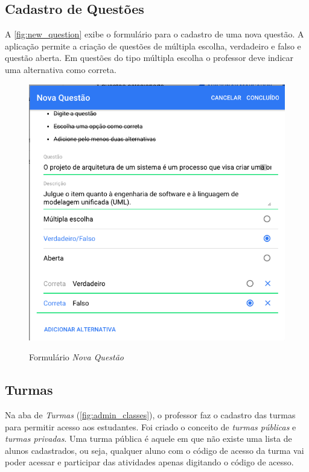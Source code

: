 \subsection{Cadastro de Questões}

A \autoref{fig:new_question} exibe o formulário para o cadastro de uma nova questão.
A aplicação permite a criação de questões de múltipla escolha, verdadeiro e falso e questão aberta.
Em questões do tipo múltipla escolha o professor deve indicar uma alternativa como correta.

\begin{figure}[h]
  \centering
  \caption{Formulário \textit{Nova Questão}}
  \includegraphics[scale=.5]{imagens/telas/new_question}
  \doautor
  \label{fig:new_question}
\end{figure}

\subsection{Turmas}
\label{subsection:turmas}

Na aba de \textit{Turmas} (\autoref{fig:admin_classes}), o professor faz o cadastro das turmas
para permitir acesso aos estudantes. Foi criado o conceito de \textit{turmas públicas}
e \textit{turmas privadas}. Uma turma pública é aquele em que não existe uma
lista de alunos cadastrados, ou seja, qualquer aluno com o código de acesso da turma
vai poder acessar e participar das atividades apenas digitando o código de acesso.

